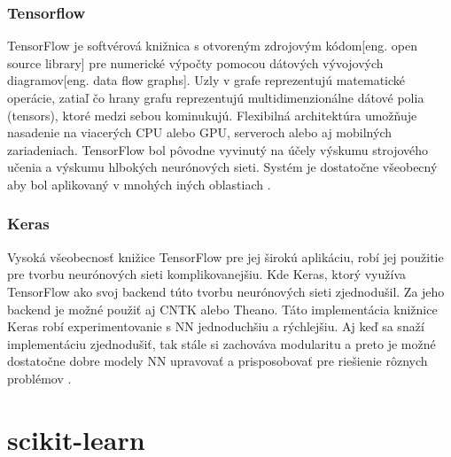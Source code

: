 \subsubsection{Tensorflow}
TensorFlow je softvérová knižnica s otvoreným zdrojovým kódom[eng. open source library] pre numerické výpočty pomocou dátových vývojových diagramov[eng. data flow graphs].
Uzly v grafe reprezentujú matematické operácie, zatiaľ čo hrany grafu reprezentujú multidimenzionálne dátové polia (tensors), ktoré medzi sebou kominukujú.
Flexibilná architektúra umožňuje nasadenie na viacerých CPU alebo GPU, serveroch alebo aj mobilných zariadeniach.
TensorFlow bol pôvodne vyvinutý na účely výskumu strojového učenia a výskumu hlbokých neurónových sieti.
Systém je dostatočne všeobecný aby bol aplikovaný v mnohých iných oblastiach \cite{odkaz:TensorFlow}.

\subsubsection{Keras}
Vysoká všeobecnosť knižice TensorFlow pre jej širokú aplikáciu, robí jej použitie pre tvorbu neurónových sieti komplikovanejšiu.
Kde Keras, ktorý využíva TensorFlow ako svoj backend túto tvorbu neurónových sieti zjednodušil.
Za jeho backend je možné použiť aj CNTK alebo Theano.
Táto implementácia knižnice Keras robí experimentovanie s NN jednoduchšiu a rýchlejšiu.
Aj keď sa snaží implementáciu zjednodušiť, tak stále si zachováva modularitu a preto je možné dostatočne dobre modely NN upravovať a prisposobovať pre riešienie rôznych problémov \cite{odkaz:Keras}.

\section{scikit-learn}
\label{sec:scikitlearn}

